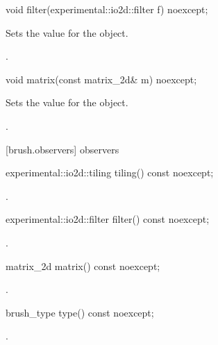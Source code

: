 \begin{itemdecl}
void filter(experimental::io2d::filter f) noexcept;
\end{itemdecl}
\begin{itemdescr}
\pnum
\effects
Sets the  value for the  object.

\pnum
\postconditions
{}.
\end{itemdescr}

\begin{itemdecl}
void matrix(const matrix_2d& m) noexcept;
\end{itemdecl}
\begin{itemdescr}
\pnum
\effects
Sets the  value for the  object.

\pnum
\postconditions
{}.
\end{itemdescr}

 [brush.observers]{ observers}

\begin{itemdecl}
experimental::io2d::tiling tiling() const noexcept;
\end{itemdecl}
\begin{itemdescr}
\pnum
\returns
{}.
\end{itemdescr}

\begin{itemdecl}
experimental::io2d::filter filter() const noexcept;
\end{itemdecl}
\begin{itemdescr}
\pnum
\returns
{}.
\end{itemdescr}

\begin{itemdecl}
matrix_2d matrix() const noexcept;
\end{itemdecl}
\begin{itemdescr}
\pnum
\returns
{}.
\end{itemdescr}

\begin{itemdecl}
brush_type type() const noexcept;
\end{itemdecl}
\begin{itemdescr}
\pnum
\returns
{}.
\end{itemdescr}
